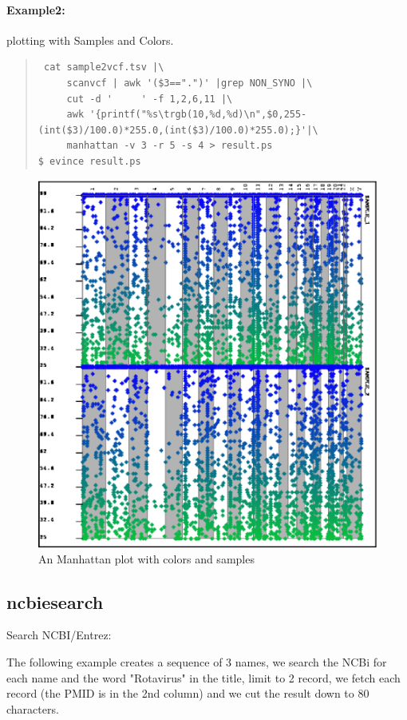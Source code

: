 \documentclass[12pt]{article}
\begin{document}
\paragraph{Example2:}
plotting with Samples and Colors.
\begin{quote}
\begin{verbatim}
 cat sample2vcf.tsv |\
     scanvcf | awk '($3==".")' |grep NON_SYNO |\
     cut -d '     ' -f 1,2,6,11 |\
     awk '{printf("%s\trgb(10,%d,%d)\n",$0,255-(int($3)/100.0)*255.0,(int($3)/100.0)*255.0);}'|\
     manhattan -v 3 -r 5 -s 4 > result.ps
$ evince result.ps
\end{verbatim}
\end{quote}
\begin{figure}
\includegraphics[keepaspectratio=true,scale=1.0]{manhattan2.eps}
\caption{An Manhattan plot with colors and samples}
\end{figure}

\subsection{ncbiesearch}
Search NCBI/Entrez:

The following example creates a sequence of 3 names, we search the NCBi for each name and the word "Rotavirus" in the title, limit to 2 record, we fetch each record (the PMID is in the 2nd column) and we cut the result down to 80 characters.
 
\end{document}
